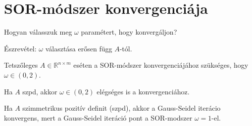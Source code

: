 \section{SOR-módszer konvergenciája}
\begin{kerdes}
    Hogyan válasszuk meg $\omega$ paramétert, hogy konvergáljon?
\end{kerdes}
Észrevétel: $\omega$ választása erősen függ $A$-tól.
\begin{allitas}
    Tetszőleges $A \in \mathbb{R}^{n \times m}$ eséten a SOR-módszer konvergenciájához szükséges, hogy $\omega \in (0, 2)$.
\end{allitas}
\begin{allitas}
    Ha $A$ szpd, akkor $\omega \in (0, 2)$ elégséges is a konvergenciához.
\end{allitas}
\begin{kov}
    Ha $A$ szimmetrikus pozitív definit (szpd), akkor a Gauss-Seidel iterácio konvergens, mert a Gauss-Seidel iteráció pont a SOR-modszer $\omega = 1$-el.
\end{kov}

